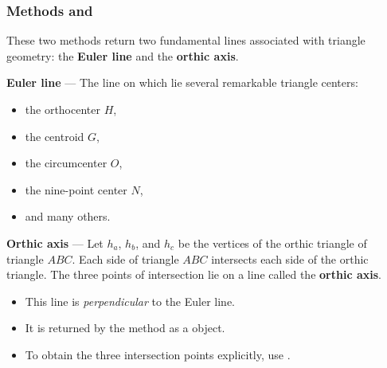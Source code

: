 \subsubsection{Methods  and } %
\label{ssub:euler_line}

These two methods return two fundamental lines associated with triangle geometry: the \textbf{Euler line} and the \textbf{orthic axis}.

\medskip

\textbf{Euler line} — The line on which lie several remarkable triangle centers:
\begin{itemize}
  \item the orthocenter $H$,
  \item the centroid $G$,
  \item the circumcenter $O$,
  \item the nine-point center $N$,
  \item and many others.
\end{itemize}



\medskip

\textbf{Orthic axis} — Let $h_a$, $h_b$, and $h_c$ be the vertices of the orthic triangle of triangle $ABC$. Each side of triangle $ABC$ intersects each side of the orthic triangle. The three points of intersection lie on a line called the \textbf{orthic axis}.

\begin{itemize}
  \item This line is \emph{perpendicular} to the Euler line.
  \item It is returned by the method  as a  object.
  \item To obtain the three intersection points explicitly, use .
\end{itemize}


\vspace{1em}

